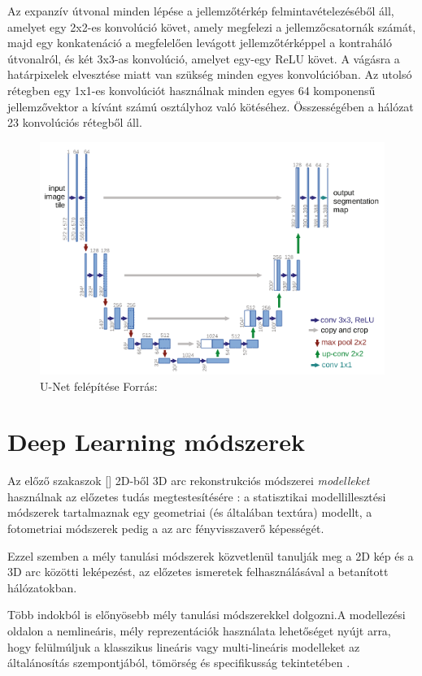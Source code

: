 \documentclass[12pt,a4]{article}
\begin{document}
    Az expanzív útvonal minden lépése a jellemzőtérkép felmintavételezéséből áll, amelyet egy 2x2-es konvolúció követ, amely megfelezi a jellemzőcsatornák számát, majd egy konkatenáció a megfelelően levágott jellemzőtérképpel a kontraháló útvonalról, és két 3x3-as konvolúció, amelyet egy-egy ReLU követ. A vágásra a határpixelek elvesztése miatt van szükség
minden egyes konvolúcióban. Az utolsó rétegben egy 1x1-es konvolúciót használnak minden egyes
64 komponensű jellemzővektor a kívánt számú osztályhoz való kötéséhez. Összességében a
hálózat 23 konvolúciós rétegből áll.
    
    \begin{figure}[h]	
 		\centering
 		\includegraphics[width=1\linewidth]{unet}
 		\caption{U-Net felépítése
 			Forrás:\cite{unet}}
        \label{fig:unet}
 	\end{figure}
   
	\section{Deep Learning módszerek}
	
	Az előző szakaszok [] 2D-ből 3D arc rekonstrukciós módszerei \textit{modelleket} használnak az előzetes tudás megtestesítésére \cite{survey}: a statisztikai modellillesztési módszerek tartalmaznak egy geometriai (és általában textúra) modellt, a fotometriai módszerek pedig a
	az arc fényvisszaverő képességét. 
	
	
	Ezzel szemben a mély tanulási módszerek
	közvetlenül tanulják meg a 2D kép és a 3D arc közötti leképezést, az előzetes ismeretek felhasználásával a betanított hálózatokban.
	
	
	Több indokból is előnyösebb mély tanulási módszerekkel dolgozni.\cite{3dmm}A modellezési oldalon a nemlineáris, mély reprezentációk használata lehetőséget nyújt arra, hogy felülmúljuk a klasszikus lineáris vagy multi-lineáris modelleket az általánosítás szempontjából, tömörség és specifikusság tekintetében \cite{styner}.
	
\end{document}
